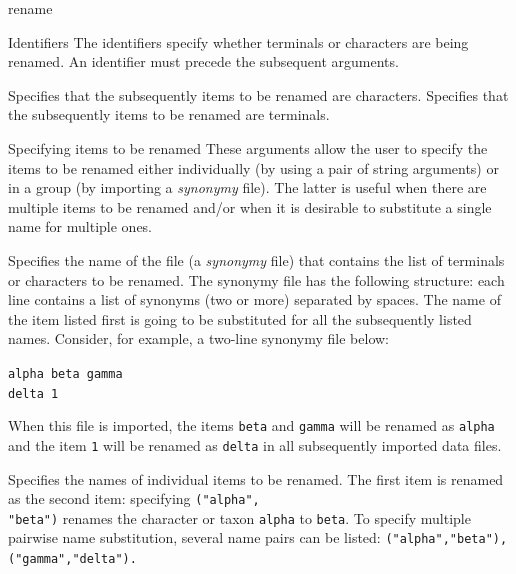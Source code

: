 \begin{command}{rename}{}
    \begin{arguments}
		\begin{argumentgroup}{Identifiers}
		{The identifiers specify whether terminals or characters are being
        renamed. An identifier must precede the subsequent arguments.}
		
            {Specifies that the subsequently items to be renamed are characters.} 
            {}
            {Specifies that the subsequently items to be renamed are terminals.} 
            {}
	\end{argumentgroup}
	      
	      \begin{argumentgroup}{Specifying items to be renamed}
	      {These arguments allow the user to specify the items to be renamed either individually (by 
	      using a pair of string arguments) or in a group (by importing a \emph{synonymy} file).
	      The latter is useful when there are multiple items to be renamed and/or when it is
	      desirable to substitute a single name for  multiple ones.}
	      
                {Specifies the name of the file (a \emph{synonymy} file) that contains the list of
                terminals or characters to be renamed. The synonymy file has the following structure:
                each line contains a list of synonyms (two or more) separated by spaces. The name of the
                item listed first is going to be substituted for all the subsequently listed names. Consider,
                for example, a two-line synonymy file below:
                
                \texttt{alpha beta gamma \\
                delta 1\\}
                 
                 When this file is imported, the items \texttt{beta} and \texttt{gamma} will be
                 renamed as \texttt{alpha} and the item \texttt{1} will be renamed as \texttt{delta}
                 in all subsequently imported data files.}
                {}
                {Specifies the names of individual items to be renamed. The first item is renamed
                as the second item: specifying \texttt{("alpha",\\"beta")} renames the character or taxon
                \texttt{alpha} to \texttt{beta}. To specify multiple pairwise name substitution, several 
                name pairs can be listed: \texttt{("alpha","beta"),("gamma","delta").}}
                {}
                

\end{argumentgroup}
\end{arguments}
\end{command}
